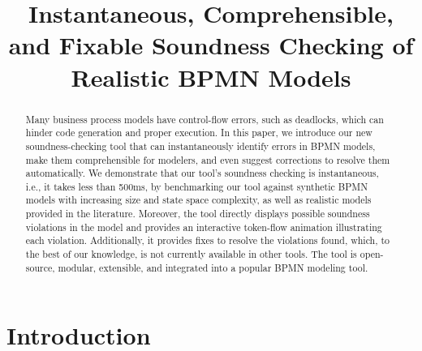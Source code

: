 \documentclass[runningheads]{llncs}
\begin{document}
%
\title{Instantaneous, Comprehensible, and Fixable Soundness Checking of Realistic BPMN Models}
%
%
\maketitle              %
%
\begin{abstract}
Many business process models have control-flow errors, such as deadlocks, which can hinder code generation and proper execution.
In this paper, we introduce our new soundness-checking tool that can instantaneously identify errors in BPMN models, make them comprehensible for modelers, and even suggest corrections to resolve them automatically.
We demonstrate that our tool's soundness checking is instantaneous, i.e., it takes less than 500ms, by benchmarking our tool against synthetic BPMN models with increasing size and state space complexity, as well as realistic models provided in the literature.
Moreover, the tool directly displays possible soundness violations in the model and provides an interactive token-flow animation illustrating each violation.
Additionally, it provides fixes to resolve the violations found, which, to the best of our knowledge, is not currently available in other tools.
The tool is open-source, modular, extensible, and integrated into a popular BPMN modeling tool.

\end{abstract}

\renewcommand{\labelenumi}{(\textbf{\arabic{enumi})}}

\section{Introduction} \label{sec:introduction}
\end{document}
